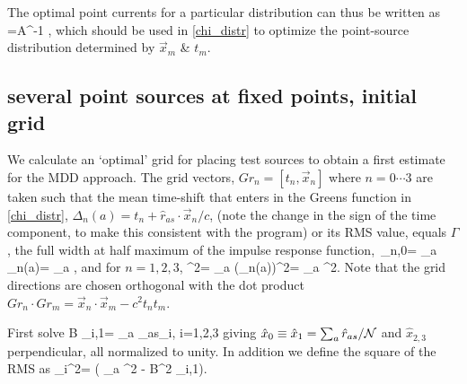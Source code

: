 The optimal point currents for a particular distribution can thus be written as
\beq
{}=A^{-1}  \;, 
\eeq
which should be used in \eqref{chi_distr} to optimize the point-source distribution determined by $\vec{x}_m$ \& $t_m$.

\subsection{several  point sources at fixed points, initial grid}

We calculate an `optimal' grid for placing test sources to obtain a first estimate for the MDD approach. The grid vectors, $Gr_n=[t_n,\vec{x}_n]$ where $n=0\cdots 3$ are taken such that the mean time-shift that enters in the Greens function in \eqref{chi_distr}, $\Delta_n(a)=t_n + \hat{r}_{as}\cdot \vec{x}_n/c $, (note the change in the sign of the time component, to make this consistent with the program) or its RMS value, equals $\Gamma$, the full width at half maximum of the impulse response function,
\beq
\Gamma\,\delta_{n,0}= \sum_a \Delta_n(a)=  \sum_a \;, 
\eeq
and for $n=1,2,3$,
\beq
\Gamma^2= \sum_a (\Delta_n(a))^2=  \sum_a  ^2\;.  
\eeq
Note that the grid directions are chosen orthogonal with the dot product $Gr_n \cdot Gr_m= \vec{x}_n \cdot \vec{x}_m - c^2 t_n t_m$.

First solve
\beq
B \delta_{i,1}= \sum_a  _{as}\cdot {}_i\;, i=1,2,3
\eeq
giving $\hat{x}_0\equiv\hat{x}_1=\sum_a \hat{r}_{as}/{\cal N}$ and $\hat{x}_{2,3}$ perpendicular, all normalized to unity.
In addition we define the square of the RMS as
\beq
\sigma_i^2=  \left(  \sum_a  ^2 - B^2 \delta_{i,1}\right)\;.
\eeq

